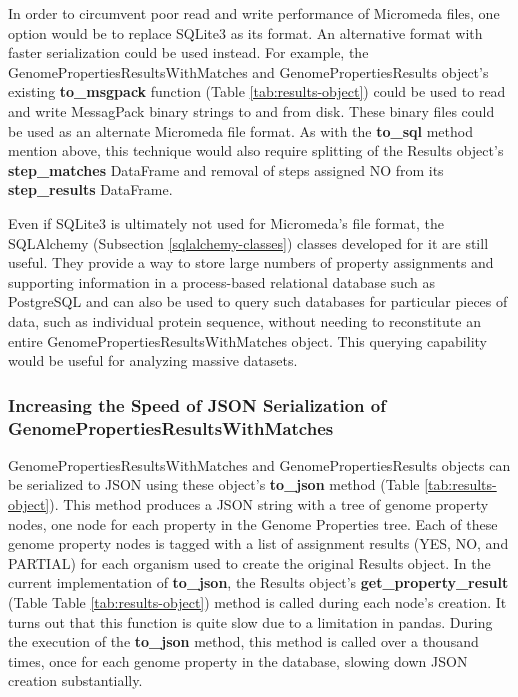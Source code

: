 In order to circumvent poor read and write performance of Micromeda files, one option would be to replace SQLite3 as its format. An alternative format with faster serialization could be used instead. For example, the GenomePropertiesResultsWithMatches and GenomePropertiesResults object's existing \textbf{to\_msgpack} function (Table \ref{tab:results-object}) could be used to read and write MessagPack binary strings to and from disk. These binary files could be used as an alternate Micromeda file format. As with the \textbf{to\_sql} method mention above, this technique would also require splitting of the Results object's \textbf{step\_matches} DataFrame and removal of steps assigned NO from its \textbf{step\_results} DataFrame.

Even if SQLite3 is ultimately not used for Micromeda's file format, the SQLAlchemy (Subsection \ref{sqlalchemy-classes}) classes developed for it are still useful. They provide a way to store large numbers of property assignments and supporting information in a process-based relational database such as PostgreSQL and can also be used to query such databases for particular pieces of data, such as individual protein sequence, without needing to reconstitute an entire GenomePropertiesResultsWithMatches object. This querying capability would be useful for analyzing massive datasets.

\subsubsection{Increasing the Speed of JSON Serialization of GenomePropertiesResultsWithMatches} \label{pygenprop-json-serialization}

GenomePropertiesResultsWithMatches and GenomePropertiesResults objects can be serialized to JSON using these object's \textbf{to\_json} method (Table \ref{tab:results-object}). This method produces a JSON string with a tree of genome property nodes, one node for each property in the Genome Properties tree. Each of these genome property nodes is tagged with a list of assignment results (YES, NO, and PARTIAL) for each organism used to create the original Results object. In the current implementation of \textbf{to\_json}, the Results object's \textbf{get\_property\_result} (Table Table \ref{tab:results-object}) method is called during each node's creation. It turns out that this function is quite slow due to a limitation in pandas. During the execution of the \textbf{to\_json} method, this method is called over a thousand times, once for each genome property in the database, slowing down JSON creation substantially.

